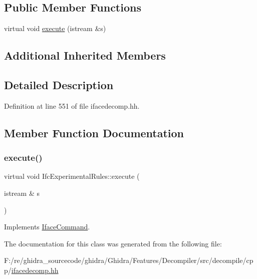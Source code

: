\subsection*{Public Member Functions}
\begin{DoxyCompactItemize}
\item 
virtual void \mbox{\hyperlink{class_ifc_experimental_rules_ac41dc0e7894add267ee11c3665406609}{execute}} (istream \&s)
\end{DoxyCompactItemize}
\subsection*{Additional Inherited Members}


\subsection{Detailed Description}


Definition at line 551 of file ifacedecomp.\+hh.



\subsection{Member Function Documentation}
\mbox{\label{class_ifc_experimental_rules_ac41dc0e7894add267ee11c3665406609}} 
\subsubsection{\texorpdfstring{execute()}{execute()}}
{\footnotesize\ttfamily virtual void Ifc\+Experimental\+Rules\+::execute (\begin{DoxyParamCaption}\item[{istream \&}]{s }\end{DoxyParamCaption})\hspace{0.3cm}{\ttfamily [virtual]}}



Implements \mbox{\hyperlink{class_iface_command_af10e29cee2c8e419de6efe9e680ad201}{Iface\+Command}}.



The documentation for this class was generated from the following file\+:\begin{DoxyCompactItemize}
\item 
F\+:/re/ghidra\+\_\+sourcecode/ghidra/\+Ghidra/\+Features/\+Decompiler/src/decompile/cpp/\mbox{\hyperlink{ifacedecomp_8hh}{ifacedecomp.\+hh}}\end{DoxyCompactItemize}
